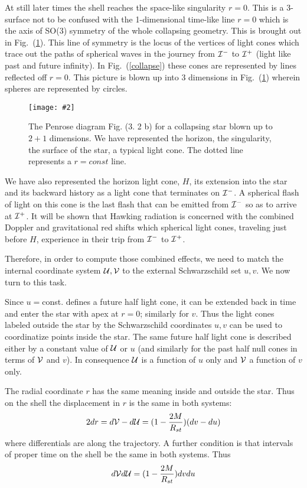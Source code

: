 \documentclass[12pt,oneside]{report}
\newcommand{\dessin}[4]
{\begin{figure}[tp]\begin{center}
\texttt{[image: \#2]}%
\end{center}
\caption{#4}
\label{#3}
\end{figure}}
\begin{document}
At still later times the shell 
reaches the space-like singularity $r=0$. This is a 
3-surface not to be
confused with the 1-dimensional time-like line $r=0$ which is the axis of
 SO(3)  symmetry of the whole collapsing geometry. This is brought out in Fig.~(\ref{tridcoll}).
  This line of symmetry is the locus of the vertices of light cones which trace out
the paths of spherical waves in the journey from ${\cal I}^-$ to
 ${\cal I}^+$ (light like past and future infinity). In Fig.~(\ref{collapse})
these cones are
represented by
lines reflected off $r=0$. 
This picture is blown
up into 3 dimensions in Fig.~(\ref{tridcoll}) wherein spheres 
are represented by
circles. 
\dessin{1.000}{NFIG3-3.eps}{tridcoll}{The Penrose diagram Fig. (3. 2 b) for a collapsing star blown up to $2+1$
dimensions. We have represented the horizon, the singularity, the surface of
the star, a typical light cone. The dotted line represents a $r=const$ line.
}
We have also represented the horizon light cone, $H$,
 its extension into the star and its backward
history as a light cone that terminates on  ${\cal I}^-$. A
spherical flash of light on this cone is the last flash that can be
emitted from  ${\cal I}^-$ so as to arrive at  ${\cal I}^+$. 
It will be shown that Hawking
radiation is concerned with the combined Doppler and gravitational
red shifts which spherical light cones, traveling just before $H$,
experience in their trip from   ${\cal I}^-$ to  ${\cal I}^+$.


Therefore, in order to compute those combined effects,
we need to match the internal coordinate system $ 
{\cal{U}} ,  {\cal{V}} $ to the external Schwarzschild set $u,v$.
We now turn to this task.

Since $u=$const. defines a future half light
cone, it can be extended back in time and enter the star with apex
at $r=0$; similarly for $v$. Thus the light cones labeled outside
the star by the Schwarzschild coordinates $u,v$ can be used to
coordinatize points inside the star. The same future half light cone
is described either by a constant value of $ {\cal{U}} $ or $u$ 
(and similarly for the past half null cones in terms of $ {\cal{V}} $ and $v$). In consequence $
{\cal{U}} $ is a function of $u$ only and $ {\cal{V}} $ a function of $v$ only.

The radial coordinate $r$ has the same meaning
inside and outside the star.
Thus on the shell the displacement in $r$ is the same in both systems:
\begin{eqnarray} 2 dr = d{\cal{V}} - d {\cal{U}}  = (1 - {2M \over
R_{st}})(dv - du) \label{E.2}
\end{eqnarray}
where differentials are along the trajectory. A further
condition is that intervals of proper time on the shell be the
same in both systems. Thus 
\begin{eqnarray} d{\cal{V}} d {\cal{U}}  = (1 - {2M \over
R_{st}})dv du \label{E.3}
\end{eqnarray}
\end{document}
